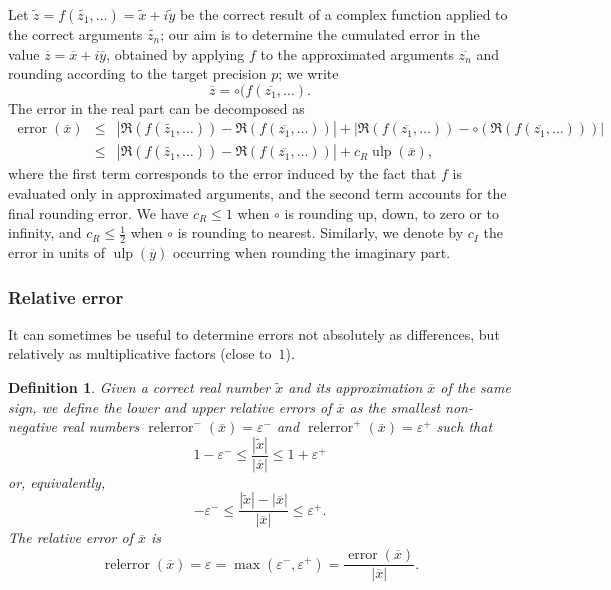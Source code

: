 \documentclass {article}
\newcommand {\corr}[1]{\widetilde {#1}}
\newcommand {\appro}[1]{\overline {#1}}
\newcommand {\Ulp}{{\operatorname {ulp}}}
\newcommand{\error}{\operatorname {error}}
\newcommand{\relerror}{\operatorname {relerror}}
\renewcommand {\epsilon}{\varepsilon}
\renewcommand {\leq}{\leqslant}
\newtheorem{definition}[theorem]{Definition}
\begin{document}
Let $\corr z = f (\corr {z_1}, \ldots) = \corr x + i \corr y$ be the correct
result of a complex function applied to the correct arguments $\corr {z_n}$;
our aim is to determine the cumulated error in the value
$\appro z = \appro x + i \appro y$, obtained by applying $f$ to the approximated
arguments $\appro {z_n}$ and rounding according to the target precision $p$;
we write
\[
\appro z = \circ (f (\appro {z_1}, \ldots).
\]
The error in the real part can be decomposed as
\begin {equation}
\label {eq:error}
\begin {array}{rcl}
\error (\appro x)
& \leq & | \Re (f (\corr {z_1}, \ldots)) - \Re (f (\appro {z_1}, \ldots)) |
+ | \Re (f (\appro {z_1}, \ldots)) - \circ (\Re (f (\appro {z_1}, \ldots))) | \\
& \leq &
| \Re (f (\corr {z_1}, \ldots)) - \Re (f (\appro {z_1}, \ldots)) |
+ c_R \Ulp (\appro x),
\end {array}
\end {equation}
where the first term corresponds to the error induced by the fact that $f$
is evaluated only in approximated arguments, and the second term accounts
for the final rounding error. We have $c_R \leq 1$ when $\circ$ is rounding up,
down, to zero or to infinity, and $c_R \leq \frac {1}{2}$ when $\circ$ is
rounding to nearest.
Similarly, we denote by $c_I$ the error in units of $\Ulp (\appro y)$
occurring when rounding the imaginary part.


\subsubsection {Relative error}

It can sometimes be useful to determine errors not absolutely as differences,
but relatively as multiplicative factors (close to~$1$).

\begin {definition}
\label {def:relerror}
Given a correct real number $\corr x$ and its approximation $\appro x$
of the same sign,
we define the {\em lower and upper relative errors} of $\appro x$
as the smallest non-negative real numbers
$\relerror^- (\appro x) = \epsilon^-$ and
$\relerror^+ (\appro x) = \epsilon^+$
such that
\[
1 - \epsilon^- \leq \frac {|\corr x|}{|\appro x|} \leq
1 + \epsilon^+
\]
or, equivalently,
\[
- \epsilon^- \leq \frac {|\corr x| - |\appro x|}{| \appro x| } \leq
\epsilon^+.
\]
The {\em relative error} of $\appro x$ is
\[
\relerror (\appro x) = \epsilon = \max (\epsilon^-, \epsilon^+)
= \frac {\error (\appro x)}{|\appro x|}.
\]
\end {definition}
\end{document}

